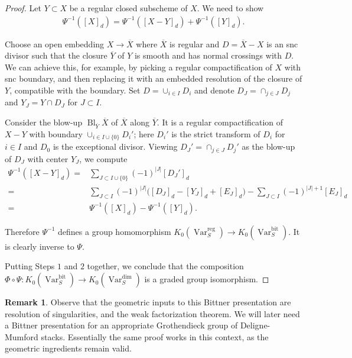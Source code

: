\documentclass{amsart}
\theoremstyle{definition}
\newtheorem{rmk}[thm]{Remark}
\DeclareMathOperator{\Var}{Var}
\DeclareMathOperator{\Bl}{Bl}
\DeclareMathOperator{\reg}{reg}
\DeclareMathOperator{\bit}{bit}
\newcommand{\KdimS}{K_0(\Var_S^{\dim})}
\numberwithin{equation}{section}
\begin{document}
\begin{proof}
Let $Y \subset X$ be a regular closed subscheme of $X$. We need to show 
\begin{align*}
    \Psi^{-1}([X]_d) = \Psi^{-1}([X-Y]_d) + \Psi^{-1}([Y]_d).
\end{align*}

Choose an open embedding $X \rightarrow \overline{X}$ where $\overline{X}$ is regular and $D = \overline{X} - X$ is an snc divisor such that the closure $\overline{Y}$ of $Y$ is smooth and has normal crossings with $D$. We can achieve this, for example, by picking a regular compactification of $X$ with snc boundary, and then replacing it with an embedded resolution of the closure of $Y$, compatible with the boundary. Set $D = \cup_{i \in I} D_i$ and denote $D_J = \cap_{j \in J} D_j$ and $Y_J = Y \cap D_J$ for $J \subset I$.

Consider the blow-up $\Bl_{\overline{Y}} \overline{X}$ of $\overline{X}$ along $\overline{Y}$. It is a regular compactification of $X-Y$ with boundary $\cup_{i \in I \cup \{0\}} D_i'$; here $D_i'$ is the strict transform of $D_i$ for $i \in I$ and $D_0$ is the exceptional divisor. Viewing $D_J' = \cap_{j \in J} D_j'$ as the blow-up of $D_J$ with center $Y_J$, we compute
\begin{align*}
    \Psi^{-1}([X-Y]_d) =& \sum_{J \subset I \cup \{0\}} (-1)^{|J|} [D_J']_d \\
    =& \sum_{J \subset I} (-1)^{|J|} \big( [D_J]_d - [Y_J]_d + [E_J]_d \big) - \sum_{J \subset I} (-1)^{|J|+1} [E_J]_d \\
    =& \Psi^{-1}([X]_d) - \Psi^{-1}([Y]_d).
\end{align*}

Therefore $\Psi^{-1}$ defines a group homomorphism $K_0(\Var_S^{\reg}) \rightarrow K_0(\Var_S^{\bit})$. It is clearly inverse to $\Psi$.

Putting Steps $1$ and $2$ together, we conclude that the composition $\Phi \circ \Psi: K_0(\Var_S^{\bit}) \rightarrow \KdimS$ is a graded group isomorphism.
\end{proof}

\begin{rmk}
Observe that the geometric inputs to this Bittner presentation are resolution of singularities, and the weak factorization theorem. We will later need a Bittner presentation for an appropriate Grothendieck group of Deligne-Mumford stacks. Essentially the same proof works in this context, as the geometric ingredients remain valid.
\end{rmk}
\end{document}
